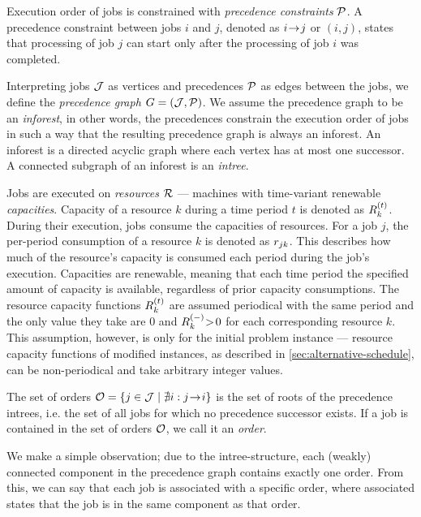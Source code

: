 Execution order of jobs is constrained with \emph{precedence constraints} $\mathcal{P}$.
A precedence constraint between jobs $i$ and $j$, denoted as $i \hspace{-0.2em} \rightarrow \hspace{-0.2em} j$ or $(i, j)$,
states that processing of job $j$ can start only after the processing of job $i$ was completed.

Interpreting jobs $\mathcal{J}$ as vertices and precedences $\mathcal{P}$ as edges between the jobs,
we define the \emph{precedence graph} $G = (\mathcal{J}, \mathcal{P})$.
We assume the precedence graph to be an \emph{inforest}, in other words,
the precedences constrain the execution order of jobs in such a way that the resulting precedence graph
is always an inforest.
An inforest is a directed acyclic graph where each vertex has at most one successor.
A connected subgraph of an inforest is an \emph{intree}.

Jobs are executed on \emph{resources} $\mathcal{R}$ --- machines with time-variant renewable \emph{capacities}.
Capacity of a resource $k$ during a time period $t$ is denoted as $\capacity{k}{t}$.
During their execution, jobs consume the capacities of resources.
For a job $j$, the per-period consumption of a resource $k$ is denoted as $r_{j k}$.
This describes how much of the resource's capacity is consumed each period during the job's execution.
Capacities are renewable, meaning that each time period the specified amount of capacity is available,
regardless of prior capacity consumptions.
The resource capacity functions $\capacity{k}{t}$ are assumed periodical with the same period
and the only value they take are $0$ and $\shiftcapacity{k} \negmedspace>\! 0$ for each corresponding resource $k$.
This assumption, however, is only for the initial problem instance
--- resource capacity functions of modified instances, as described in \cref{sec:alternative-schedule},
can be non-periodical and take arbitrary integer values.

The set of orders $\mathcal{O} = \{ j \in \mathcal{J} \mid \nexists i : j \hspace{-0.2em} \rightarrow \hspace{-0.2em} i \}$
is the set of roots of the precedence intrees,
i.e. the set of all jobs for which no precedence successor exists.
If a job is contained in the set of orders $\mathcal{O}$, we call it an \emph{order}.

We make a simple observation; due to the intree-structure,
each (weakly) connected component in the precedence graph contains exactly one order.
From this, we can say that each job is associated with a specific order,
where associated states that the job is in the same component as that order.

